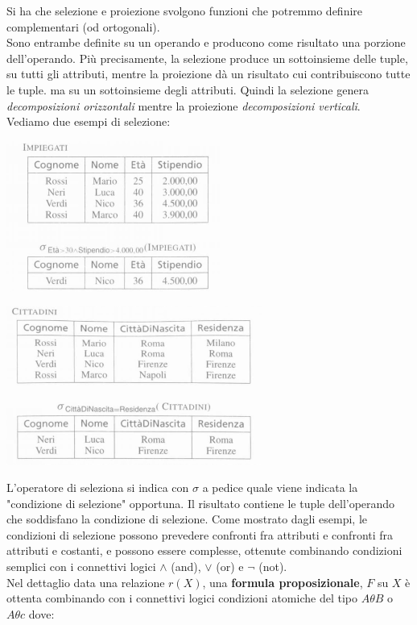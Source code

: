 \documentclass[a4paper,12pt, oneside]{book}
\begin{document}
Si ha che selezione e proiezione
svolgono funzioni che potremmo definire complementari (od ortogonali).\\
Sono
entrambe definite su un operando e producono come risultato una porzione
dell'operando. Più precisamente, la selezione produce un sottoinsieme delle tuple, su
tutti gli attributi, mentre la proiezione dà un risultato cui contribuiscono tutte le
tuple. ma su un sottoinsieme degli attributi. Quindi la selezione genera \textit{decomposizioni orizzontali} mentre la proiezione \textit{decomposizioni verticali}.\\
Vediamo due esempi di selezione:
\begin{center}
\includegraphics[scale=0.7]{img/alg6.png}
\end{center}
\begin{center}
\includegraphics[scale=0.7]{img/alg7.png}
\end{center}
L'operatore di seleziona si indica con $\sigma$ a pedice quale viene indicata la "condizione di selezione" opportuna.
Il risultato contiene
le tuple dell'operando che soddisfano la condizione di selezione. Come mostrato
dagli esempi, le condizioni di selezione possono prevedere confronti fra attributi e
confronti fra attributi e costanti, e possono essere complesse, ottenute combinando
condizioni semplici con i connettivi logici $\wedge$ (and), $\vee$ (or) e $\neg$ (not).\\ Nel dettaglio data una relazione $r(X)$, una \textbf{formula proposizionale}, $F$ su $X$ è ottenta combinando con i connettivi logici condizioni atomiche del tipo $A\theta B$ o $A\theta c$ dove:
\end{document}
